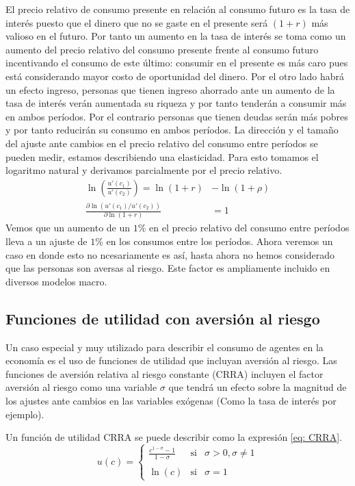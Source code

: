 El precio relativo de consumo presente en relación al consumo futuro es la tasa de interés puesto que el dinero que no se gaste en el presente será $(1+r)$ más valioso en el futuro. Por tanto un aumento en la tasa de interés se toma como un aumento del precio relativo del consumo presente frente al consumo futuro incentivando el consumo de este último: consumir en el presente es más caro pues está considerando mayor costo de oportunidad del dinero. Por el otro lado habrá un efecto ingreso, personas que tienen ingreso ahorrado ante un aumento de la tasa de interés verán aumentada su riqueza y por tanto tenderán a consumir más en ambos períodos. Por el contrario personas que tienen deudas serán más pobres y por tanto reducirán su consumo en ambos períodos. 
La dirección y el tamaño del ajuste ante cambios en el precio relativo del consumo entre períodos se pueden medir, estamos describiendo una elasticidad. Para esto tomamos el logaritmo natural y derivamos parcialmente por el precio relativo.
\begin{align*}
    \ln \left( \frac{u'(c_1)}{u'(c_2)} \right) = \ln (1+r) &- \ln(1+\rho)\\
    \frac{\partial \ln (u'(c_1)/u'(c_2))}{\partial \ln (1+r)}  &= 1
\end{align*}
Vemos que un aumento de un $1\%$ en el precio relativo del consumo entre períodos lleva a un ajuste de $1\%$ en los consumos entre los períodos. Ahora veremos un caso en donde esto no ncesariamente es así, hasta ahora no hemos considerado que las personas son aversas al riesgo. Este factor es ampliamente incluido en diversos modelos macro.

\subsection{Funciones de utilidad con aversión al riesgo}

Un caso especial y muy utilizado para describir el consumo de agentes en la economía es el uso de funciones de utilidad que incluyan aversión al riesgo. Las funciones de aversión relativa al riesgo constante (CRRA) incluyen el factor aversión al riesgo como una variable $\sigma$ que tendrá un efecto sobre la magnitud de los ajustes ante cambios en las variables exógenas (Como la tasa de interés por ejemplo). 

Un función de utilidad CRRA se puede describir como la expresión \ref{eq: CRRA}.
\begin{equation}
    u(c)= \left\{ \begin{array}{lcc} \frac{c^{1-\sigma}-1}{1-\sigma} & \text{si} & \sigma >0,\sigma \neq 1 \\ \\ \ln{(c)} & \text{si} & \sigma = 1 \end{array} \right. \label{eq: CRRA}
\end{equation}

